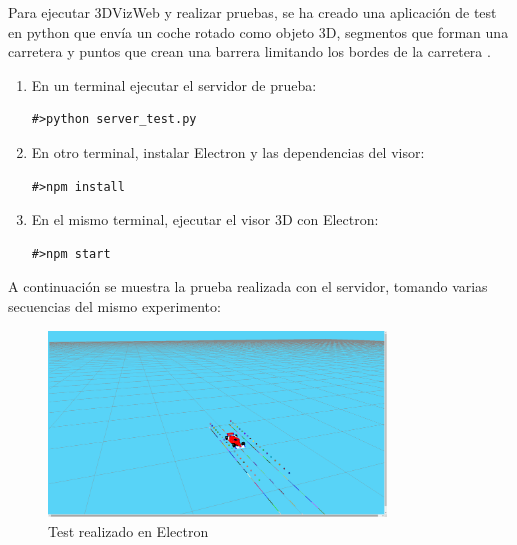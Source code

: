 Para ejecutar 3DVizWeb y realizar pruebas, se ha creado una aplicación de test en python que envía un coche rotado como objeto 3D, segmentos que forman una carretera y puntos que crean una barrera limitando los bordes de la carretera .

\begin{enumerate}
\item En un terminal ejecutar el servidor de prueba:

\begin{lstlisting}[caption= Ejecutar servidor de prueba, label=cod.testserver]
#>python server_test.py
\end{lstlisting}

\item En otro terminal, instalar Electron y las dependencias del visor:

\begin{lstlisting}[caption= Instalar Electron y sus dependencias, label=cod.instalarelectron]
#>npm install
\end{lstlisting}

\item En el mismo terminal, ejecutar el visor 3D con Electron:

\begin{lstlisting}[caption= Ejecutar el visor 3D mediante Electron, label=cod.tratarobjetos]
#>npm start
\end{lstlisting}

\end{enumerate}

A continuación se muestra la prueba realizada con el servidor, tomando varias secuencias del mismo experimento:

\begin{figure}[H]
  \begin{center}
    \includegraphics[width=0.8\textwidth]{figures/3DVizWeb.png}
    		\caption{Test realizado en Electron}
		\label{fig.test3dviz1}
		\end{center}
\end{figure}













